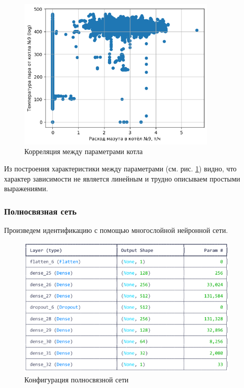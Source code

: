 \begin{figure}[H]
  \begin{center}
    \includegraphics[width=0.85\textwidth]{figures/plots/kotel_temp_mazut_rel.png}
  \end{center}
  \caption{Корреляция между параметрами котла}\label{fig:plt:kotel:rel}
\end{figure}

Из построения характеристики между параметрами (см. рис.
\ref{fig:plt:kotel:rel}) видно, что характер зависимости не является линейным и
трудно описываем простыми выражениями. 

\subsubsection{Полносвязная сеть}

Произведем идентификацию с помощью многослойной нейронной сети. 

\begin{figure}[H]
  \begin{center}
    \includegraphics[width=0.95\textwidth]{figures/tensorflow/dense.png}
  \end{center}
  \caption{Конфигурация полносвязной сети}\label{fig:tf:dense}
\end{figure}

